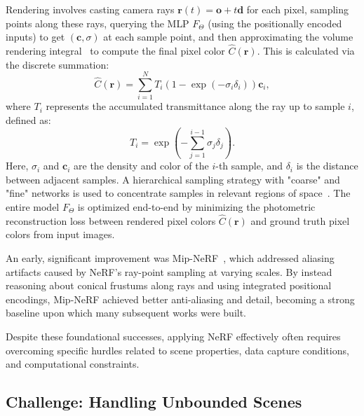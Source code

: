 Rendering involves casting camera rays $\mathbf{r}(t) = \mathbf{o} + t\mathbf{d}$ for each pixel, sampling points along these rays, querying the MLP $F_{\Theta}$ (using the positionally encoded inputs) to get $(\mathbf{c}, \sigma)$ at each sample point, and then approximating the volume rendering integral~\cite{kajiya1984ray, mildenhall2020nerf} to compute the final pixel color $\hat{C}(\mathbf{r})$. This is calculated via the discrete summation:
\begin{equation}
    \hat{C}(\mathbf{r}) = \sum_{i=1}^{N} T_i (1 - \exp(-\sigma_i \delta_i)) \mathbf{c}_i,
\label{eq:volume_rendering_discrete} %
\end{equation}
where $T_i$ represents the accumulated transmittance along the ray up to sample $i$, defined as:
\begin{equation}
    T_i = \exp\left(-\sum_{j=1}^{i-1} \sigma_j \delta_j\right).
\label{eq:transmittance_discrete} %
\end{equation}
Here, $\sigma_i$ and $\mathbf{c}_i$ are the density and color of the $i$-th sample, and $\delta_i$ is the distance between adjacent samples. A hierarchical sampling strategy with "coarse" and "fine" networks is used to concentrate samples in relevant regions of space~\cite{mildenhall2020nerf}. The entire model $F_{\Theta}$ is optimized end-to-end by minimizing the photometric reconstruction loss between rendered pixel colors $\hat{C}(\mathbf{r})$ and ground truth pixel colors from input images.

An early, significant improvement was Mip-NeRF~\cite{barron2021mipnerf}, which addressed aliasing artifacts caused by NeRF's ray-point sampling at varying scales. By instead reasoning about conical frustums along rays and using integrated positional encodings, Mip-NeRF achieved better anti-aliasing and detail, becoming a strong baseline upon which many subsequent works were built.

Despite these foundational successes, applying NeRF effectively often requires overcoming specific hurdles related to scene properties, data capture conditions, and computational constraints.

\subsection{Challenge: Handling Unbounded Scenes}
\label{subsec:unbounded_challenge_revised}

